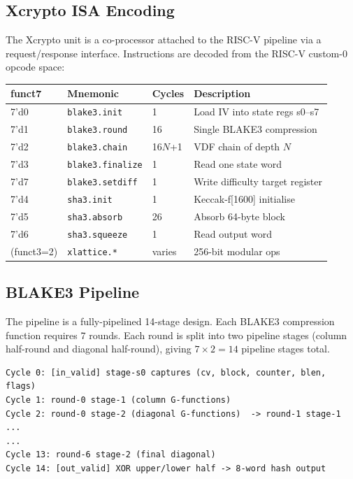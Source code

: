 \documentclass[11pt,a4paper]{article}
\begin{document}
\subsection{Xcrypto ISA Encoding}

The Xcrypto unit is a co-processor attached to the RISC-V pipeline via a
request/response interface. Instructions are decoded from the RISC-V custom-0
opcode space:

\begin{center}
\begin{tabular}{llll}
\toprule
\textbf{funct7} & \textbf{Mnemonic} & \textbf{Cycles} & \textbf{Description} \\
\midrule
7'd0 & \texttt{blake3.init}     & 1        & Load IV into state regs s0--s7 \\
7'd1 & \texttt{blake3.round}    & 16       & Single BLAKE3 compression \\
7'd2 & \texttt{blake3.chain}    & 16$N$+1  & VDF chain of depth $N$ \\
7'd3 & \texttt{blake3.finalize} & 1        & Read one state word \\
7'd7 & \texttt{blake3.setdiff}  & 1        & Write difficulty target register \\
\midrule
7'd4 & \texttt{sha3.init}       & 1        & Keccak-f[1600] initialise \\
7'd5 & \texttt{sha3.absorb}     & 26       & Absorb 64-byte block \\
7'd6 & \texttt{sha3.squeeze}    & 1        & Read output word \\
\midrule
(funct3=2) & \texttt{xlattice.*} & varies  & 256-bit modular ops \\
\bottomrule
\end{tabular}
\end{center}

\subsection{BLAKE3 Pipeline}

The pipeline is a fully-pipelined 14-stage design. Each BLAKE3 compression
function requires 7 rounds. Each round is split into two pipeline stages
(column half-round and diagonal half-round), giving
$7 \times 2 = 14$ pipeline stages total.

\begin{verbatim}
Cycle 0: [in_valid] stage-s0 captures (cv, block, counter, blen, flags)
Cycle 1: round-0 stage-1 (column G-functions)
Cycle 2: round-0 stage-2 (diagonal G-functions)  -> round-1 stage-1 ...
...
Cycle 13: round-6 stage-2 (final diagonal)
Cycle 14: [out_valid] XOR upper/lower half -> 8-word hash output
\end{verbatim}
\end{document}
